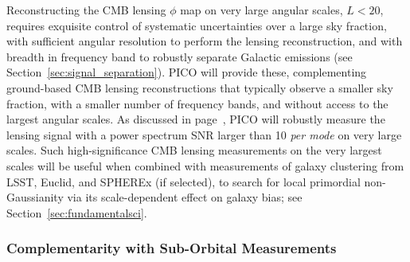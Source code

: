 \documentclass[PICOReport.tex]{subfiles}
\begin{document}
Reconstructing the CMB lensing $\phi$ map on very large angular scales, $L<20$, requires exquisite control of systematic uncertainties over a large sky fraction, with sufficient angular resolution to perform the lensing reconstruction, and with breadth in frequency band to robustly separate Galactic emissions (see Section~\ref{sec:signal_separation}). PICO will provide these, complementing ground-based CMB lensing reconstructions that typically observe a smaller sky fraction, with a smaller number of frequency bands, and without access to the largest angular scales. As discussed in page~\pageref{gravitationallensing}, PICO will robustly measure the lensing signal with a power spectrum \ac{SNR} larger than 10 {\it per mode} on very large scales. Such high-significance CMB lensing measurements on the very largest scales will be useful when combined with measurements of galaxy clustering from LSST, Euclid, and SPHEREx (if selected),  to search for local primordial non-Gaussianity via its scale-dependent effect on galaxy bias; see Section~\ref{sec:fundamentalsci}.


\subsubsection{Complementarity with Sub-Orbital Measurements}
\end{document}
